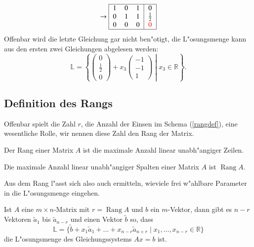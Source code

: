 \begin{beispiel}
\begin{align*}
\rightarrow
\begin{tabular}{|>{$}c<{$}>{$}c<{$}>{$}c<{$}|>{$}c<{$}|}
\hline
1&0&1&0\\
0&1&1&\frac12\\
0&0&0&\color{red}0\\
\hline
\end{tabular}
\end{align*}
Offenbar wird die letzte Gleichung gar nicht ben"otigt, die
L"osungsmenge kann aus den ersten zwei Gleichungen
abgelesen werden:
\[
\mathbb L=
\left\{
\left.
\begin{pmatrix}
0\\\frac12\\0
\end{pmatrix}
+x_3\begin{pmatrix}
-1\\-1\\1
\end{pmatrix}
\;
\right|\;
x_3\in\mathbb R
\right\}.
\]
\end{beispiel}

\subsection{Definition des Rangs}
Offenbar spielt die Zahl $r$, die Anzahl der Einsen im Schema (\ref{rangdef}),
eine wesentliche Rolle, wir nennen diese Zahl den Rang der Matrix.

\begin{definition}
Der Rang einer Matrix $A$ ist die maximale Anzahl linear unabh"angiger Zeilen.
\end{definition}
\begin{satz}
Die maximale Anzahl linear unabh"angiger Spalten einer Matrix $A$ ist
$\operatorname{Rang}A$.
\end{satz}
Aus dem Rang l"asst sich also auch ermitteln, wieviele frei w"ahlbare
Parameter in die L"osungsmenge eingehen.
\begin{satz}
Ist $A$ eine $m\times n$-Matrix mit $r=\operatorname{Rang}A$ 
und $b$ ein $m$-Vektor, dann gibt es $n-r$ Vektoren $\tilde a_1$
bis $\tilde a_{n-r}$ und einen Vektor $\tilde b$ so, dass
\[
\mathbb L
=
\{
\tilde b+x_1\tilde a_1+\dots+x_{n-r}\tilde a_{n+r}\;|\;x_1,\dots,x_{n-r}\in\mathbb R
\}
\]
die L"osungsmenge des Gleichungssystems $Ax=b$ ist.
\end{satz}


